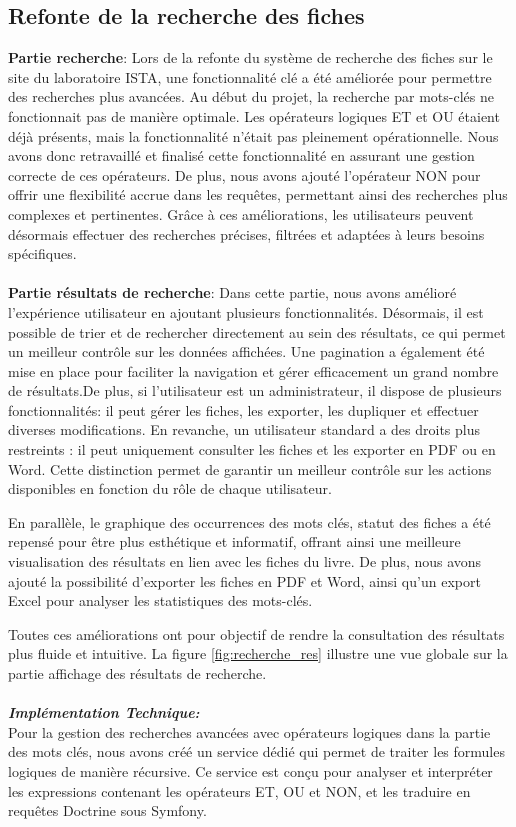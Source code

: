 \documentclass[12pt]{article}
\begin{document}
    \subsection{Refonte de la recherche des fiches}
    \textbf{Partie recherche}:
    Lors de la refonte du système de recherche des fiches sur le site du laboratoire ISTA, une fonctionnalité clé a été améliorée pour permettre des recherches plus avancées. Au début du projet, la recherche par mots-clés ne fonctionnait pas de manière optimale. Les opérateurs logiques ET et OU étaient déjà présents, mais la fonctionnalité n’était pas pleinement opérationnelle. Nous avons donc retravaillé et finalisé cette fonctionnalité en assurant une gestion correcte de ces opérateurs. De plus, nous avons ajouté l'opérateur NON pour offrir une flexibilité accrue dans les requêtes, permettant ainsi des recherches plus complexes et pertinentes. Grâce à ces améliorations, les utilisateurs peuvent désormais effectuer des recherches précises, filtrées et adaptées à leurs besoins spécifiques.
    \\
    \\
    \textbf{Partie résultats de recherche}:
    Dans cette partie, nous avons amélioré l'expérience utilisateur en ajoutant plusieurs fonctionnalités. Désormais, il est possible de trier et de rechercher directement au sein des résultats, ce qui permet un meilleur contrôle sur les données affichées. Une pagination a également été mise en place pour faciliter la navigation et gérer efficacement un grand nombre de résultats.De plus, si l'utilisateur est un administrateur, il dispose de plusieurs fonctionnalités: il peut gérer les fiches, les exporter, les dupliquer et effectuer diverses modifications. En revanche, un utilisateur standard a des droits plus restreints : il peut uniquement consulter les fiches et les exporter en PDF ou en Word. Cette distinction permet de garantir un meilleur contrôle sur les actions disponibles en fonction du rôle de chaque utilisateur.

    En parallèle, le graphique des occurrences des mots clés, statut des fiches a été repensé pour être plus esthétique et informatif, offrant ainsi une meilleure visualisation des résultats en lien avec les fiches du livre. De plus, nous avons ajouté la possibilité d'exporter les fiches en PDF et Word, ainsi qu'un export Excel pour analyser les statistiques des mots-clés.

    Toutes ces améliorations ont pour objectif de rendre la consultation des résultats plus fluide et intuitive.
    La figure \ref{fig:recherche_res} illustre une vue globale sur la partie affichage des résultats de recherche.
    \\
    \\ \textit{\textbf{Implémentation Technique:}} \\
    Pour la gestion des recherches avancées avec opérateurs logiques dans la partie des mots clés, nous avons créé un service dédié qui permet de traiter les formules logiques de manière récursive. Ce service est conçu pour analyser et interpréter les expressions contenant les opérateurs ET, OU et NON, et les traduire en requêtes Doctrine sous Symfony.
    \\
\end{document}

